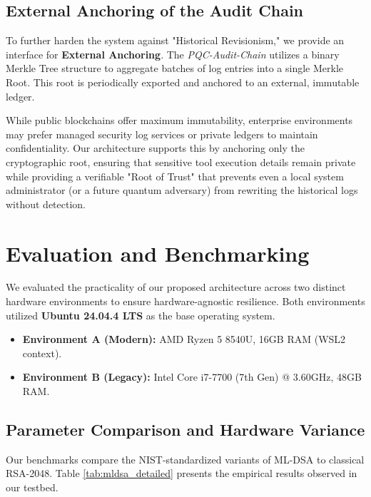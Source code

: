 \documentclass[conference]{IEEEtran}
\begin{document}
\subsection{External Anchoring of the Audit Chain}
To further harden the system against "Historical Revisionism," we provide an interface for \textbf{External Anchoring}. The \textit{PQC-Audit-Chain} utilizes a binary Merkle Tree structure to aggregate batches of log entries into a single Merkle Root. This root is periodically exported and anchored to an external, immutable ledger.

While public blockchains offer maximum immutability, enterprise environments may prefer managed security log services or private ledgers to maintain confidentiality. Our architecture supports this by anchoring only the cryptographic root, ensuring that sensitive tool execution details remain private while providing a verifiable "Root of Trust" that prevents even a local system administrator (or a future quantum adversary) from rewriting the historical logs without detection.

\section{Evaluation and Benchmarking}
We evaluated the practicality of our proposed architecture across two distinct hardware environments to ensure hardware-agnostic resilience. Both environments utilized \textbf{Ubuntu 24.04.4 LTS} as the base operating system.
\begin{itemize}
    \item \textbf{Environment A (Modern):} AMD Ryzen 5 8540U, 16GB RAM (WSL2 context).
    \item \textbf{Environment B (Legacy):} Intel Core i7-7700 (7th Gen) @ 3.60GHz, 48GB RAM.
\end{itemize}

\subsection{Parameter Comparison and Hardware Variance}
Our benchmarks compare the NIST-standardized variants of ML-DSA to classical RSA-2048. Table \ref{tab:mldsa_detailed} presents the empirical results observed in our testbed.
\end{document}
